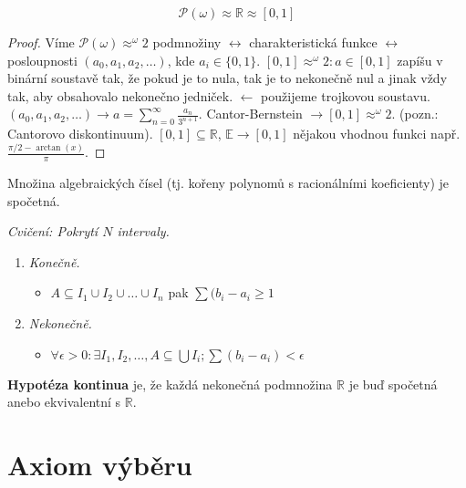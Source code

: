 \begin{thm}
	$$
	\mathcal{P}(\omega) \approx \mathbb{R} \approx [0,1]
	$$
\end{thm}

\begin{proof}
	Víme $\mathcal{P}(\omega) \approx ^{\omega}2$ podmnožiny $\leftrightarrow$ charakteristická funkce $\leftrightarrow$ posloupnosti $(a_{0},a_{1},a_{2},\dots)$, kde $a_{i} \in \{0,1\}$. $[0,1] \approx ^{\omega}2: a \in [0,1]$ zapíšu v binární soustavě tak, že pokud je to nula, tak je to nekonečně nul a jinak vždy tak, aby obsahovalo nekonečno jedniček. $\leftarrow$ použijeme trojkovou soustavu. $(a_{0},a_{1},a_{2},\dots) \to a = \sum_{n = 0}^{\infty} \frac{a_{n}}{3^{n+1}}$. Cantor-Bernstein $\rightarrow [0,1] \approx ^{\omega}2$. (pozn.: Cantorovo diskontinuum). $[0,1] \subseteq \mathbb{R}$, $\mathbb{E} \to [0,1]$ nějakou vhodnou funkci např. $\frac{\pi / 2 - \arctan(x)}{\pi}$.
\end{proof}

\begin{pozn}
	Množina algebraických čísel (tj. kořeny polynomů s racionálními koeficienty) je spočetná.
\end{pozn}

\textit{Cvičení: Pokrytí $N$ intervaly.}

\begin{enumerate}
	\item \textit{Konečně.}
	\begin{itemize}
		\item $A \subseteq I_{1} \cup I_{2} \cup \dots \cup I_{n}$ pak $\sum (b_{i} - a_{i} \geq 1$
	\end{itemize}
	\item \textit{Nekonečně.}
	\begin{itemize}
		\item $\forall \epsilon > 0: \exists I_{1},I_{2}, \dots, A \subseteq \bigcup I_{i}; \sum (b_{i} - a_{i}) < \epsilon$
	\end{itemize}
\end{enumerate}

\begin{pozn}
	\textbf{Hypotéza kontinua} je, že každá nekonečná podmnožina $\mathbb{R}$ je buď spočetná anebo ekvivalentní s $\mathbb{R}$.
\end{pozn}

\section{Axiom výběru}

